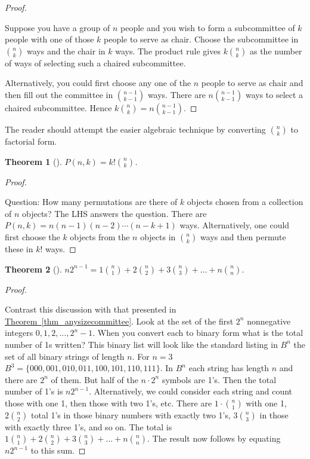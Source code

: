 \documentclass[10pt,]{book}
\theoremstyle{plain}
\newtheorem{theorem}{Theorem}[section]
\theoremstyle{definition}
\theoremstyle{definition}
\numberwithin{equation}{chapter}
\begin{document}
\begin{proof}\hypertarget{proof-16}{}
\hypertarget{p-315}{}%
Suppose you have a group of \(n\) people and you wish to form a subcommittee of \(k\) people with one of those \(k\) people to serve as chair. Choose the subcommittee in \(\binom{n}{k}\) ways and the chair in \(k\) ways. The product rule gives \(k \binom{n}{k}\) as the number of ways of selecting such a chaired subcommittee.%
\par
\hypertarget{p-316}{}%
Alternatively, you could first choose any one of the \(n\) people to serve as chair and then fill out the committee in \(\binom{n - 1}{k - 1}\) ways. There are \(n \binom{n - 1}{k - 1}\) ways to select a chaired subcommittee. Hence \(k \binom{n}{k} = n \binom{n - 1}{k - 1}\).%
\end{proof}
\hypertarget{p-317}{}%
The reader should attempt the easier algebraic technique by converting \(\binom{n}{k}\) to factorial form.%
\begin{theorem}[{}]\label{theorem-19}
\hypertarget{p-318}{}%
\(P(n,k) = k!\binom{n}{k}\).%
\end{theorem}
\begin{proof}\hypertarget{proof-17}{}
\hypertarget{p-319}{}%
Question: How many permutations are there of \(k\) objects chosen from a collection of \(n\) objects? The LHS answers the question. There are \(P(n,k) = n(n - 1)(n - 2)\cdots(n - k + 1)\) ways. Alternatively, one could first choose the \(k\) objects from the \(n\) objects in \(\binom{n}{k}\) ways and then permute these in \(k!\) ways.%
\end{proof}
\begin{theorem}[{}]\label{theorem-20}
\hypertarget{p-320}{}%
\(n2^{n - 1} = 1 \binom{n}{1} + 2 \binom{n}{2} + 3 \binom{n}{3} + \ldots + n \binom{n}{n}\).%
\end{theorem}
\begin{proof}\hypertarget{proof-18}{}
\hypertarget{p-321}{}%
Contrast this discussion with that presented in \hyperref[thm_anysizecommittee]{Theorem~\ref{thm_anysizecommittee}}. Look at the set of the first \(2^{n}\) nonnegative integers \(0,1,2,\ldots,2^{n} - 1\). When you convert each to binary form what is the total number of 1s written? This binary list will look like the standard listing in \(B^{n}\) the set of all binary strings of length \(n\). For \(n=3\) \(B^{3} = \{000,001,010,011,100,101,110,111\}\). In \(B^{n}\) each string has length \(n\) and there are \(2^{n}\) of them. But half of the \(n \cdot 2^{n}\) symbols are 1's. Then the total number of 1's is \(n2^{n - 1}\). Alternatively, we could consider each string and count those with one 1, then those with two 1's, etc. There are \(1 \cdot \binom{n}{1}\) with one 1, \(2 \binom{n}{2}\) total 1's in those binary numbers with exactly two 1's, \(3 \binom{n}{3}\) in those with exactly three 1's, and so on. The total is \(1 \binom{n}{1} + 2 \binom{n}{2} + 3 \binom{n}{3} + \ldots + n \binom{n}{n}\).  The result now follows by equating \(n2^{n - 1}\) to this sum.%
\end{proof}
\end{document}
